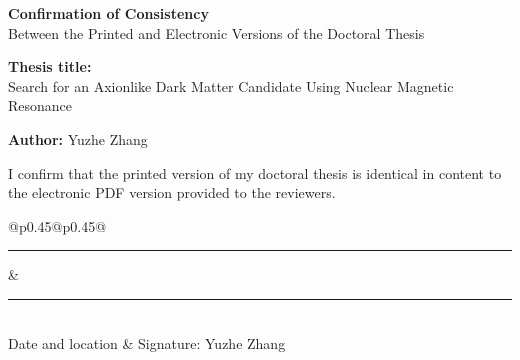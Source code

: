 \documentclass[12pt,a4paper]{article}
\begin{document}
\thispagestyle{empty}

\begin{center}
    {\Large\textbf{Confirmation of Consistency}}\\[0.6em]
    {\large Between the Printed and Electronic Versions of the Doctoral Thesis}
\end{center}

\vspace{2.0cm}

\noindent\textbf{Thesis title:}\\
Search for an Axionlike Dark Matter Candidate Using Nuclear Magnetic Resonance

\vspace{0.8cm}

\noindent\textbf{Author:} Yuzhe Zhang

\vspace{1.5cm}

I confirm that the printed version of my doctoral thesis is identical in content to the electronic PDF version provided to the reviewers.

\vfill

\begin{tabular}{@{}p{0.45\textwidth}@{\hspace{0.1\textwidth}}p{0.45\textwidth}@{}}
    \rule{\linewidth}{0.4pt} & \rule{\linewidth}{0.4pt}\\[0.4em]
    Date and location & Signature: Yuzhe Zhang
\end{tabular}
\end{document}
